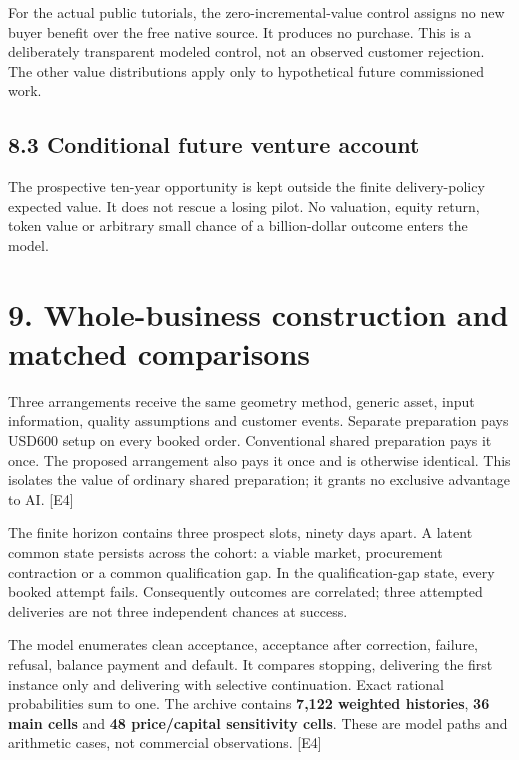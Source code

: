 \documentclass[11pt,letterpaper]{article}
\begin{document}
For the actual public tutorials, the zero-incremental-value control assigns no new buyer benefit over the free native source. It produces no purchase. This is a deliberately transparent modeled control, not an observed customer rejection. The other value distributions apply only to hypothetical future commissioned work.

\hypertarget{conditional-future-venture-account}{%
\subsection{8.3 Conditional future venture account}\label{conditional-future-venture-account}}

The prospective ten-year opportunity is kept outside the finite delivery-policy expected value. It does not rescue a losing pilot. No valuation, equity return, token value or arbitrary small chance of a billion-dollar outcome enters the model.

\hypertarget{whole-business-construction-and-matched-comparisons}{%
\section{9. Whole-business construction and matched comparisons}\label{whole-business-construction-and-matched-comparisons}}

Three arrangements receive the same geometry method, generic asset, input information, quality assumptions and customer events. Separate preparation pays USD600 setup on every booked order. Conventional shared preparation pays it once. The proposed arrangement also pays it once and is otherwise identical. This isolates the value of ordinary shared preparation; it grants no exclusive advantage to AI. {[}E4{]}

The finite horizon contains three prospect slots, ninety days apart. A latent common state persists across the cohort: a viable market, procurement contraction or a common qualification gap. In the qualification-gap state, every booked attempt fails. Consequently outcomes are correlated; three attempted deliveries are not three independent chances at success.

The model enumerates clean acceptance, acceptance after correction, failure, refusal, balance payment and default. It compares stopping, delivering the first instance only and delivering with selective continuation. Exact rational probabilities sum to one. The archive contains \textbf{7,122 weighted histories}, \textbf{36 main cells} and \textbf{48 price/capital sensitivity cells}. These are model paths and arithmetic cases, not commercial observations. {[}E4{]}
\end{document}
